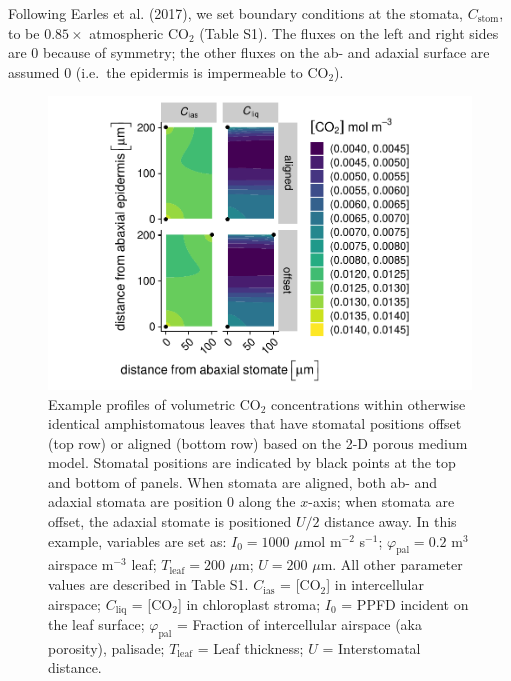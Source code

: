 \documentclass[
  letterpaper,
  DIV=11,
  numbers=noendperiod]{scrartcl}
\begin{document}
Following Earles et al. (2017), we set boundary conditions at the
stomata, \(C_\text{stom}\), to be \(0.85 \times\) atmospheric CO\(_2\)
(Table S1). The fluxes on the left and right sides are 0 because of
symmetry; the other fluxes on the ab- and adaxial surface are assumed 0
(i.e.~the epidermis is impermeable to CO\(_2\)).

\begin{figure}

{\centering \includegraphics{figures/ph2d-example.pdf}

}

\caption{Example profiles of volumetric CO\(_2\) concentrations within
otherwise identical amphistomatous leaves that have stomatal positions
offset (top row) or aligned (bottom row) based on the 2-D porous medium
model. Stomatal positions are indicated by black points at the top and
bottom of panels. When stomata are aligned, both ab- and adaxial stomata
are position 0 along the \(x\)-axis; when stomata are offset, the
adaxial stomate is positioned \(U/2\) distance away. In this example,
variables are set as: \(I_0 = 1000\) \(\mu\)mol m\(^{-2}\) s\(^{-1}\);
\(\varphi_\text{pal} = 0.2\) m\(^3\) airspace m\(^{-3}\) leaf;
\(T_\text{leaf} = 200\) \(\mu\)m; \(U = 200\) \(\mu\)m. All other
parameter values are described in Table S1. \(C_\text{ias}\) =
{[}CO\(_2\){]} in intercellular airspace; \(C_\text{liq}\) =
{[}CO\(_2\){]} in chloroplast stroma; \(I_0\) = PPFD incident on the
leaf surface; \(\varphi_\text{pal}\) = Fraction of intercellular
airspace (aka porosity), palisade; \(T_\text{leaf}\) = Leaf thickness;
\(U\) = Interstomatal distance.}

\end{figure}
\end{document}
